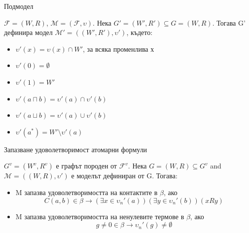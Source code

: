 \documentclass[14pt, aspectratio=169]{beamer}
\newcommand\M{\mathcal{M}}
\newcommand\F{\mathcal{F}}
\begin{document}
\begin{frame}{Подмодел}
	\begin{lemma}[Подмодел]
		$\F = (W, R)$, $\M = (\F, \upsilon)$. Нека $G'=(W',R') \subseteq G=(W, R)$. Тогава G' дефинира модел $\M' = ((W', R'), \upsilon')$, където:
		\begin{itemize}
			\item $\upsilon'(x) = \upsilon(x) \cap W'$, за всяка променлива х
			\item $\upsilon'(0) = \emptyset$
			\item $\upsilon'(1) = W'$
			\item $\upsilon'(a \sqcap b) = \upsilon'(a) \cap \upsilon'(b)$
			\item $\upsilon'(a \sqcup b) = \upsilon'(a) \cup \upsilon'(b)$
			\item $\upsilon'(a^*) = W' \setminus \upsilon'(a)$
		\end{itemize}
	\end{lemma}
\end{frame}

\begin{frame}{Запазване удоволетворимост атомарни формули}
	\begin{lemma}
		$G^v=(W^v, R^v)$ е графът породен от $\F^v$. Нека $G=(W,R) \subseteq G^v$ and $\M=((W,R), \upsilon')$ е моделът дефиниран от G. Тогава:
		\begin{itemize}
			\item<1-> M запазва удоволетворимостта на контактите в $\beta$, ако
			\begin{equation*}
				C(a,b) \in \beta \rightarrow (\exists x \in \upsilon_n'(a))(\exists y \in \upsilon_n'(b))(xRy)
			\end{equation*}

			\item<2-> M запазва удоволетворимостта на ненулевите термове в $\beta$, ако
			\begin{equation*}
				g \neq 0 \in \beta \rightarrow \upsilon_n'(g) \neq \emptyset
			\end{equation*}
		\end{itemize}
	\end{lemma}
\end{frame}
\end{document}
